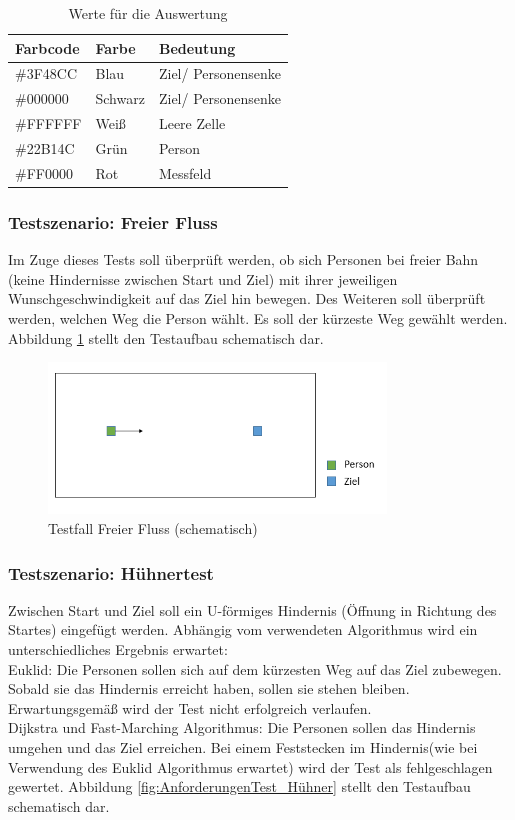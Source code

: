 \begin{table}[htpb]
	\centering
	\begin{tabular}{lll}
		Farbcode & Farbe & Bedeutung\\ \hline
		\#3F48CC & Blau & Ziel/ Personensenke \\	
		\#000000 & Schwarz & Ziel/ Personensenke \\
		\#FFFFFF & Weiß & Leere Zelle \\
		\#22B14C & Grün & Person \\
		\#FF0000 & Rot  & Messfeld
	\end{tabular}
	\caption{Werte für die Auswertung}
	\label{tab:Farbcodes}
\end{table}
 
\subsubsection{Testszenario: Freier Fluss}
Im Zuge dieses Tests soll überprüft werden, ob sich Personen bei freier Bahn (keine Hindernisse zwischen Start und Ziel) mit ihrer jeweiligen Wunschgeschwindigkeit auf das Ziel hin bewegen. Des Weiteren soll überprüft werden, welchen Weg die Person wählt. Es soll der kürzeste Weg gewählt werden. Abbildung \ref{fig:AnforderungenTest_FreierFluss} stellt den Testaufbau schematisch dar.

\begin{figure}[htpb]
	\centering
	\includegraphics[width=0.8\textwidth]{abbildungen/Test_FreierFluss.png}
	\caption{Testfall Freier Fluss (schematisch)}
	\label{fig:AnforderungenTest_FreierFluss}
\end{figure}

\subsubsection{Testszenario: Hühnertest}
Zwischen Start und Ziel soll ein U-förmiges Hindernis (Öffnung in Richtung des Startes) eingefügt werden. Abhängig vom verwendeten Algorithmus wird ein unterschiedliches Ergebnis erwartet:\\
Euklid: Die Personen sollen sich auf dem kürzesten Weg auf das Ziel zubewegen. Sobald sie das Hindernis erreicht haben, sollen sie stehen bleiben. Erwartungsgemäß wird der Test nicht erfolgreich verlaufen. \\
Dijkstra und Fast-Marching Algorithmus: Die Personen sollen das Hindernis umgehen und das Ziel erreichen. Bei einem \glqq Feststecken im Hindernis\grqq (wie bei Verwendung des Euklid Algorithmus erwartet) wird der Test als fehlgeschlagen gewertet. Abbildung \ref{fig:AnforderungenTest_Hühner} stellt den Testaufbau schematisch dar.

